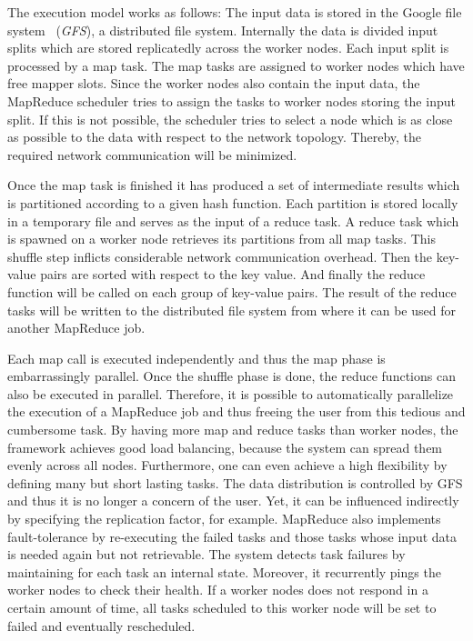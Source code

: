 The execution model works as follows:
The input data is stored in the Google file system~\cite{ghemawat:2003a} (\emph{GFS}), a distributed file system.
Internally the data is divided input splits which are stored replicatedly across the worker nodes.
Each input split is processed by a map task.
The map tasks are assigned to worker nodes which have free mapper slots.
Since the worker nodes also contain the input data, the MapReduce scheduler tries to assign the tasks to worker nodes storing the input split.
If this is not possible, the scheduler tries to select a node which is as close as possible to the data with respect to the network topology.
Thereby, the required network communication will be minimized.

Once the map task is finished it has produced a set of intermediate results which is partitioned according to a given hash function.
Each partition is stored locally in a temporary file and serves as the input of a reduce task.
A reduce task which is spawned on a worker node retrieves its partitions from all map tasks.
This shuffle step inflicts considerable network communication overhead.
Then the key-value pairs are sorted with respect to the key value.
And finally the reduce function will be called on each group of key-value pairs.
The result of the reduce tasks will be written to the distributed file system from where it can be used for another MapReduce job.

Each map call is executed independently and thus the map phase is embarrassingly parallel.
Once the shuffle phase is done, the reduce functions can also be executed in parallel.
Therefore, it is possible to automatically parallelize the execution of a MapReduce job and thus freeing the user from this tedious and cumbersome task.
By having more map and reduce tasks than worker nodes, the framework achieves good load balancing, because the system can spread them evenly across all nodes.
Furthermore, one can even achieve a high flexibility by defining many but short lasting tasks.
The data distribution is controlled by GFS and thus it is no longer a concern of the user.
Yet, it can be influenced indirectly by specifying the replication factor, for example.
MapReduce also implements fault-tolerance by re-executing the failed tasks and those tasks whose input data is needed again but not retrievable.
The system detects task failures by maintaining for each task an internal state.
Moreover, it recurrently pings the worker nodes to check their health.
If a worker nodes does not respond in a certain amount of time, all tasks scheduled to this worker node will be set to failed and eventually rescheduled.


